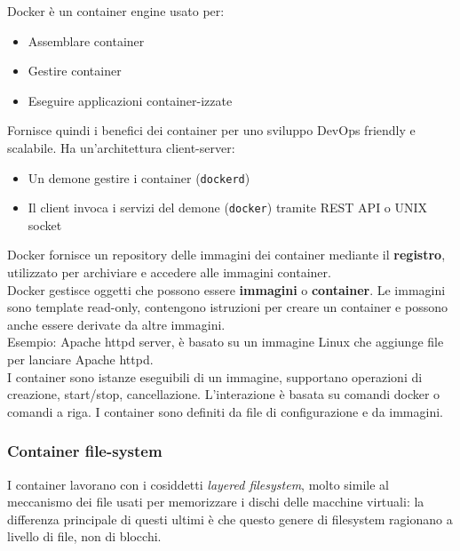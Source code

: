\documentclass{article}
\begin{document}
		Docker è un container engine usato per:
		\begin{itemize}
			\item Assemblare container
			\item Gestire container
			\item Eseguire applicazioni container-izzate
		\end{itemize}
		Fornisce quindi i benefici dei container per uno sviluppo DevOps friendly e scalabile.
		Ha un'architettura client-server:
		\begin{itemize}
			\item Un demone gestire i container (\verb*|dockerd|)
			\item Il client invoca i servizi del demone (\verb*|docker|) tramite REST API o UNIX socket
		\end{itemize}
		Docker fornisce un repository delle immagini dei container mediante il \textbf{registro}, utilizzato per archiviare e accedere alle immagini container.\\
		
		Docker gestisce oggetti che possono essere \textbf{immagini} o \textbf{container}.
		Le immagini sono template read-only, contengono istruzioni per creare un container e possono anche essere derivate da altre immagini.\\
		Esempio: Apache httpd server, è basato su un immagine Linux che aggiunge file per lanciare Apache httpd.\\
		
		I container sono istanze eseguibili di un immagine, supportano operazioni di creazione, start/stop, cancellazione.
		L'interazione è basata su comandi docker o comandi a riga. I container sono definiti da file di configurazione e da immagini.
		
		\subsubsection{Container file-system}
		I container lavorano con i cosiddetti \emph{layered filesystem}, molto simile al meccanismo dei file usati per memorizzare i dischi delle macchine virtuali: la differenza principale di questi ultimi è che questo genere di filesystem ragionano a livello
		di file, non di blocchi.\\
		
\end{document}
